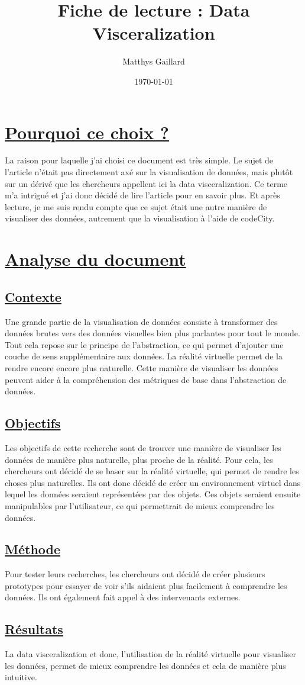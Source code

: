 \documentclass[a4paper,10pt, oneside]{article}
\title{Fiche de lecture : Data Visceralization}
\author{Matthys Gaillard}
\date{\today}
\begin{document}
\maketitle
\section{\ul{Pourquoi ce choix ?}}
	\par La raison pour laquelle j'ai choisi ce document\cite{A5} est très simple. Le sujet de l'article n'était pas directement axé sur la visualisation de données, mais plutôt 
	sur un dérivé que les chercheurs appellent ici la data visceralization. Ce terme m'a intrigué et j'ai donc décidé de lire l'article pour en savoir plus. Et après lecture,
	je me suis rendu compte que ce sujet était une autre manière de visualiser des données, autrement que la visualisation à l'aide de codeCity.

\section{\ul{Analyse du document}}
\subsection{\ul{Contexte}} 
		\par Une grande partie de la visualisation de données consiste à transformer des données brutes vers des données visuelles bien plus parlantes pour tout le monde.
		Tout cela repose sur le principe de l'abstraction, ce qui permet d'ajouter une couche de sens supplémentaire aux données. La réalité virtuelle permet de la rendre encore
		encore plus naturelle. Cette manière de visualiser les données peuvent aider à la compréhension des métriques de base dans l'abstraction de données.
\subsection{\ul{Objectifs}}
		\par Les objectifs de cette recherche sont de trouver une manière de visualiser les données de manière plus naturelle, plus proche de la réalité. Pour cela, les chercheurs
		ont décidé de se baser sur la réalité virtuelle, qui permet de rendre les choses plus naturelles. Ils ont donc décidé de créer un environnement virtuel dans lequel les
		données seraient représentées par des objets. Ces objets seraient ensuite manipulables par l'utilisateur, ce qui permettrait de mieux comprendre les données.
\subsection{\ul{Méthode}}
		\par Pour tester leurs recherches, les chercheurs ont décidé de créer plusieurs prototypes pour essayer de voir s'ils aidaient plus facilement à comprendre les données.
		Ils ont également fait appel à des intervenants externes.
\subsection{\ul{Résultats}}
\par La data visceralization et donc, l'utilisation de la réalité virtuelle pour visualiser les données, permet de mieux comprendre les données et cela de manière plus intuitive.
\newpage



\end{document}
